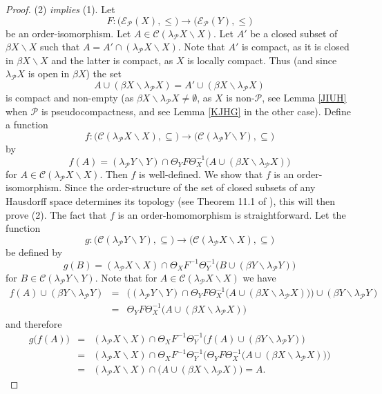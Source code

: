 \documentclass{amsart}
\theoremstyle{definition}
\theoremstyle{remark}
\theoremstyle{notation}
\numberwithin{equation}{section}
\begin{document}
\begin{proof}
(2) {\em  implies} (1). Let
\[F:\big({\mathscr E}_{{\mathcal P}}(X),\leq\big)\rightarrow\big({\mathscr E}_{{\mathcal P}}(Y),\leq\big)\]
be an order-isomorphism. Let $A\in {\mathscr C}(\lambda_{{\mathcal P}} X\backslash X)$. Let $A'$ be a closed subset of $\beta X\backslash X$ such that
$A=A'\cap(\lambda_{{\mathcal P}} X\backslash X)$. Note that $A'$ is compact, as it is closed in  $\beta X\backslash X$ and the latter is compact, as $X$ is locally compact.  Thus
(and since $\lambda_{{\mathcal P}} X$ is open in $\beta X$) the set
\[A\cup(\beta X\backslash\lambda_{{\mathcal P}} X)=A'\cup(\beta X\backslash\lambda_{{\mathcal P}} X)\]
is compact and non-empty (as $\beta X\backslash\lambda_{{\mathcal P}} X\neq\emptyset$, as $X$ is non-${\mathcal P}$, see  Lemma \ref{JIUH}  when  ${\mathcal P}$ is pseudocompactness, and see Lemma \ref{KJHG} in the other case). Define a function
\[f:\big({\mathscr C}(\lambda_{{\mathcal P}} X\backslash X),\subseteq\big)\rightarrow\big({\mathscr C}(\lambda_{{\mathcal P}} Y\backslash Y),\subseteq\big)\]
by
\[f(A)=(\lambda_{{\mathcal P}} Y\backslash Y)\cap\Theta_Y F\Theta_X^{-1}\big(A\cup(\beta X\backslash\lambda_{{\mathcal P}} X)\big)\]
for $A\in {\mathscr C}(\lambda_{{\mathcal P}} X\backslash X)$. Then $f$ is well-defined. We show that $f$ is an order-isomorphism. Since the order-structure of the set of  closed subsets of any Hausdorff space
determines its topology (see Theorem 11.1 of \cite{B}), this  will then prove (2). The fact that $f$ is an order-homomorphism is straightforward. Let the function
\[g:\big({\mathscr C}(\lambda_{{\mathcal P}} Y\backslash Y),\subseteq\big)\rightarrow\big({\mathscr C}(\lambda_{{\mathcal P}} X\backslash X),\subseteq\big)\]
be defined by
\[g(B)=(\lambda_{{\mathcal P}} X\backslash X)\cap\Theta_X F^{-1}\Theta_Y^{-1}\big(B\cup(\beta Y\backslash\lambda_{{\mathcal P}} Y)\big)\]
for $B\in {\mathscr C}(\lambda_{{\mathcal P}} Y\backslash Y)$. Note that for $A\in {\mathscr C}(\lambda_{{\mathcal P}} X\backslash X)$ we have
\begin{eqnarray*}
f(A)\cup(\beta Y\backslash\lambda_{{\mathcal P}} Y)&=&\big((\lambda_{{\mathcal P}} Y\backslash Y)\cap\Theta_Y F\Theta_X^{-1}\big(A\cup(\beta X\backslash\lambda_{{\mathcal P}} X)\big)\big)\cup(\beta Y\backslash\lambda_{{\mathcal P}} Y)\\&=&\Theta_Y F\Theta_X^{-1}\big(A\cup(\beta X\backslash\lambda_{{\mathcal P}} X)\big)
\end{eqnarray*}
and therefore
\begin{eqnarray*}
g\big(f(A)\big)&=&(\lambda_{{\mathcal P}} X\backslash X)\cap\Theta_X F^{-1}\Theta_Y^{-1}\big(f(A)\cup(\beta Y\backslash\lambda_{{\mathcal P}} Y)\big)\\&=&(\lambda_{{\mathcal P}} X\backslash X)\cap\Theta_X F^{-1}\Theta_Y^{-1}\big(\Theta_Y F\Theta_X^{-1}\big(A\cup(\beta X\backslash\lambda_{{\mathcal P}} X)\big)\big)\\&=&(\lambda_{{\mathcal P}} X\backslash X)\cap\big(A\cup(\beta X\backslash\lambda_{{\mathcal P}} X)\big)=A.

\end{eqnarray*}
\end{proof}
\end{document}

